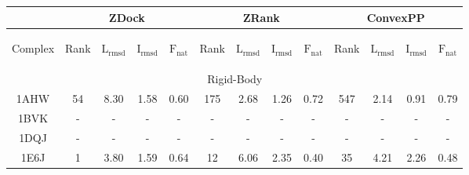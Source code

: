 
\begin{longtable}{c c c c c|c c c c|c c c c}
& 
\multicolumn{4}{c}{ZDock} &
\multicolumn{4}{c}{ZRank} &
\multicolumn{4}{c}{ConvexPP} \\
\hline
\begin{sideways}{Complex}\end{sideways}&\begin{sideways}{Rank}\end{sideways}&\begin{sideways}$\mathrm{L_{rmsd}}$\end{sideways}&\begin{sideways}$\mathrm{I_{rmsd}}$\end{sideways}&\begin{sideways}$\mathrm{F_{nat}}$\end{sideways}&\begin{sideways}{Rank}\end{sideways}&\begin{sideways}$\mathrm{L_{rmsd}}$\end{sideways}&\begin{sideways}$\mathrm{I_{rmsd}}$\end{sideways}&\begin{sideways}$\mathrm{F_{nat}}$\end{sideways}&\begin{sideways}{Rank}\end{sideways}&\begin{sideways}$\mathrm{L_{rmsd}}$\end{sideways}&\begin{sideways}$\mathrm{I_{rmsd}}$\end{sideways}&\begin{sideways}$\mathrm{F_{nat}}$\end{sideways}\\ 
 \hline
\multicolumn{13}{c}{Rigid-Body}\\
{\tiny 1AHW} &{\tiny 54}&{\tiny 8.30}&{\tiny 1.58}&{\tiny 0.60} &{\tiny 175}&{\tiny 2.68}&{\tiny 1.26}&{\tiny 0.72} &{\tiny 547}&{\tiny 2.14}&{\tiny 0.91}&{\tiny 0.79}\\ 
 {\tiny 1BVK} &{\tiny -}&{\tiny -}&{\tiny -}&{\tiny -} &{\tiny -}&{\tiny -}&{\tiny -}&{\tiny -} &{\tiny -}&{\tiny -}&{\tiny -}&{\tiny -}\\ 
 {\tiny 1DQJ} &{\tiny -}&{\tiny -}&{\tiny -}&{\tiny -} &{\tiny -}&{\tiny -}&{\tiny -}&{\tiny -} &{\tiny -}&{\tiny -}&{\tiny -}&{\tiny -}\\ 
 {\tiny 1E6J} &{\tiny 1}&{\tiny 3.80}&{\tiny 1.59}&{\tiny 0.64} &{\tiny 12}&{\tiny 6.06}&{\tiny 2.35}&{\tiny 0.40} &{\tiny 35}&{\tiny 4.21}&{\tiny 2.26}&{\tiny 0.48}\\ 

\end{longtable}
